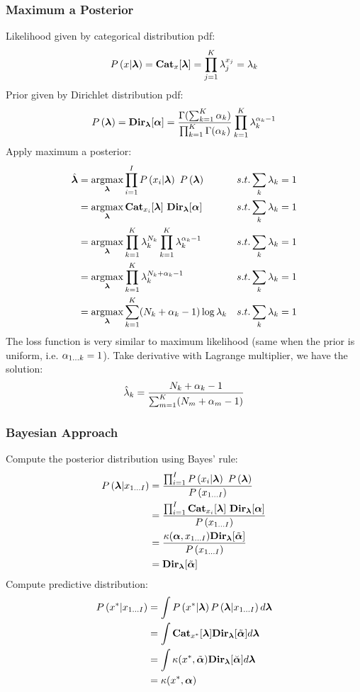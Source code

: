 \subsubsection*{Maximum a Posterior}
Likelihood given by categorical distribution pdf:
	\begin{align*}
	P\left(x|\boldsymbol{\lambda}\right)=\mathbf{Cat}_x[\boldsymbol{\lambda}]=\prod_{j=1}^K\lambda_j^{x_j}=\lambda_k
	\end{align*}
Prior given by Dirichlet distribution pdf:
	\begin{align*}
	P\left(\boldsymbol{\lambda}\right)=\mathbf{Dir}_{\boldsymbol{\lambda}}[\boldsymbol{\alpha}]=\frac{\Gamma(\sum_{k=1}^K\alpha_k)}{\prod_{k=1}^K\Gamma(\alpha_k)}\prod_{k=1}^K\lambda_k^{\alpha_k-1}
	\end{align*}
Apply maximum a posterior:
	\begin{align*}
	\hat{\vec{\la}}&=\argmax_{\vec{\la}}\prod_{i=1}^I\P{x_i|\vec{\la}}\ \P{\vec{\la}} && \text{$s.t. \sum_k\la_k=1$} \\
	&=\argmax_{\vec{\la}}\Cat_{x_i}[\vec{\la}]\ \Dir_{\vec{\la}}[\vec{\al}] && \text{$s.t. \sum_k\la_k=1$} \\
	&=\argmax_{\vec{\la}}\prod_{k=1}^K\la_k^{N_k}\prod_{k=1}^K\la_k^{\al_k-1} && \text{$s.t. \sum_k\la_k=1$} \\
	&=\argmax_{\vec{\la}}\prod_{k=1}^K\la_k^{N_k+\al_k-1} && \text{$s.t. \sum_k\la_k=1$} \\
	&=\argmax_{\vec{\la}}\sum_{k=1}^K(N_k+\al_k-1)\log\la_k && \text{$s.t. \sum_k\la_k=1$}
	\end{align*}
The loss function is very similar to maximum likelihood (same when the prior is uniform, i.e. $\alpha_{1\dots k}=1$). Take derivative with Lagrange multiplier, we have the solution:
	\begin{align*}
	\hat{\lambda}_k=\frac{N_k+\alpha_k-1}{\sum_{m=1}^K(N_m+\alpha_m-1)}
	\end{align*}

\subsubsection*{Bayesian Approach}
Compute the posterior distribution using Bayes' rule:
	\begin{align*}
	\P{\vec{\la}|x_{1\dots I}}&=\frac{\prod_{i=1}^I\P{x_i|\vec{\la}}\ \P{\vec{\la}}}{\P{x_{1\dots I}}} \\
	&=\frac{\prod_{i=1}^I\Cat_{x_i}[\vec{\la}]\ \Dir_{\vec{\la}}[\vec{\al}]}{\P{x_{1\dots I}}} \\
	&=\frac{\ka(\vec{\al},x_{1\dots I})\Dir_{\vec{\la}}[\ti{\vec{\al}}]}{\P{x_{1\dots I}}} \\
	&=\Dir_{\vec{\la}}[\ti{\vec{\al}}]
	\end{align*}
Compute predictive distribution:
	\begin{align*}
	P\left(x^*|x_{1\dots I}\right)&=\int P\left(x^*|\boldsymbol{\lambda}\right)P\left(\boldsymbol{\lambda}|x_{1\dots I}\right)d\boldsymbol{\lambda} \\
	&=\int\mathbf{Cat}_{x^*}[\boldsymbol{\lambda}]\mathbf{Dir}_{\boldsymbol{\lambda}}[\tilde{\boldsymbol{\alpha}}]d\boldsymbol{\lambda} \\
	&=\int\kappa(x^*,\tilde{\boldsymbol{\alpha}})\mathbf{Dir}_{\boldsymbol{\lambda}}[\breve{\boldsymbol{\alpha}}]d\boldsymbol{\lambda} \\
	&=\kappa(x^*,\boldsymbol{\alpha})
	\end{align*}

